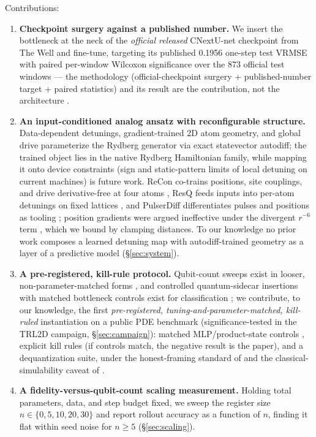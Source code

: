 \documentclass{article}
\newcommand{\TRLanchorPub}{0.1956}    %
\newcommand{\TRLwindows}{873}         %
\begin{document}
Contributions:
\begin{enumerate}
  \item \textbf{Checkpoint surgery against a published number.} We insert
  the bottleneck at the neck of the \emph{official released} CNextU-net
  checkpoint from The Well and fine-tune, targeting its published
  \TRLanchorPub{} one-step test VRMSE \citep{ohana2024thewell} with paired
  per-window Wilcoxon significance over the \TRLwindows{} official test
  windows --- the methodology (official-checkpoint surgery +
  published-number target + paired statistics) and its result are the
  contribution, not the architecture
  \citep{ma2025qufex,liu2026hqfnet,ali2026phqfno}.
  \item \textbf{An input-conditioned analog ansatz with reconfigurable
  structure.} Data-dependent detunings, gradient-trained 2D atom geometry,
  and global drive parameterize the Rydberg generator via exact statevector
  autodiff; the trained object lies in the native Rydberg Hamiltonian
  family, while mapping it onto device constraints (sign and static-pattern
  limits of local detuning on current machines) is future work. ReCon co-trains positions, site couplings, and drive derivative-free at
four atoms \citep{silver2024recon}, ResQ feeds inputs into per-atom
detunings on fixed lattices \citep{chen2026resq}, and PulserDiff
differentiates pulses and positions as tooling \citep{pulserdiff2025};
position gradients were argued ineffective under the divergent $r^{-6}$
term \citep{dekeijzer2025consensus}, which we bound by clamping distances.
To our knowledge no prior work composes a learned detuning map with
autodiff-trained geometry as a layer of a predictive model
  (\S\ref{sec:system}).
  \item \textbf{A pre-registered, kill-rule protocol.} Qubit-count sweeps exist in looser, non-parameter-matched forms
\citep{ionq2026scaling,kornjaca2024aquila,vyskubov2026scaling,zabihi2026hqpinn},
and controlled quantum-sidecar insertions with matched bottleneck controls
exist for classification \citep{levy2026sidecar}; we contribute, to our
knowledge, the first \emph{pre-registered, tuning-and-parameter-matched,
kill-ruled} instantiation on a public PDE benchmark (significance-tested in
the TRL2D campaign, \S\ref{sec:campaign}): matched
  MLP/product-state controls \citep{pandey2026qrcbaselines,bowles2024better},
  explicit kill rules (if controls match, the negative result is the paper),
  and a dequantization suite, under the honest-framing standard of
  \citet{schuld2022advantage} and the classical-simulability caveat of
  \citet{cerezo2025barren}.
  \item \textbf{A fidelity-versus-qubit-count scaling measurement.} Holding
  total parameters, data, and step budget fixed, we sweep the register size
  $n \in \{0,5,10,20,30\}$ and report rollout accuracy as a function of
  $n$, finding it flat within seed noise for $n \ge 5$
  (\S\ref{sec:scaling}).
\end{enumerate}
\end{document}
